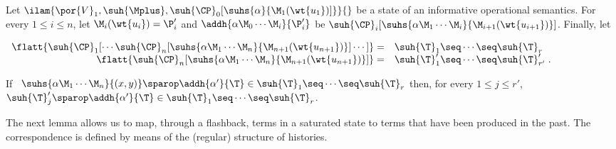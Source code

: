 \begin{proposition}
\label{prop.storie-insieme}
Let $\ilam{\por{V}_1,\suh{\Mplus}, \suh{\CP}_0[\suhs{\alpha}{\M_1(\wt{u_1})]}}{}$
be a state of an informative operational semantics. For every $1 \leq i 
\leq n$, let $\M_i(\wt{u_i}) = \P_i'$ and $\addh{\alpha\M_0 \cdots \M_i}{\P_i'}$ be 
$\suh{\CP}_i[\suhs{\alpha\M_1 \cdots \M_i}{\M_{i+1}(\wt{u_{i+1}})}]$. 
Finally, let

\smallskip

$\begin{array}{rl}
\flatt{\suh{\CP}_1[\cdots \suh{\CP}_n[\suhs{\alpha\M_1 \cdots \M_n}{\M_{n+1}(\wt{u_{n+1}})}] \cdots]} = &
\suh{\T}_1 \seq \cdots \seq \suh{\T}_r
\\
\flatt{\suh{\CP}_n[\suhs{\alpha\M_1 \cdots \M_n}{\M_{n+1}(\wt{u_{n+1}})}]} = 
& \suh{\T}_1' \seq \cdots \seq \suh{\T}_{r'}'\; .
\end{array}$

\smallskip

If  \ $\suhs{\alpha\M_1 \cdots \M_n}{(x,y)} \sparop 
\addh{\alpha'}{\T} \in \suh{\T}_1 \seq \cdots \seq \suh{\T}_r$ 
then, for every $1 \leq j \leq r'$, 
$\suh{\T}_{j}' \sparop \addh{\alpha'}{\T} \in \suh{\T}_1 \seq \cdots \seq \suh{\T}_r$.
\end{proposition}

The next lemma allows us to map, through a flashback, terms in a saturated 
state to terms that have been produced in the past. The correspondence is defined
by means of the (regular) structure of histories. 

